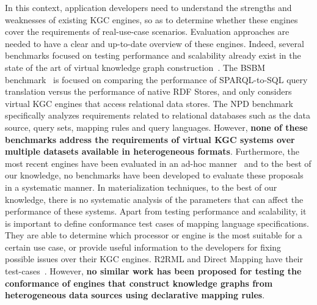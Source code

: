 In this context, application developers need to understand the strengths and weaknesses of existing KGC engines, so as to determine whether these engines cover the requirements of real-use-case scenarios. Evaluation approaches are needed to have a clear and up-to-date overview of these engines. Indeed, several benchmarks focused on testing performance and scalability already exist in the state of the art of virtual knowledge graph construction~\citep{bizer2009berlin,lanti2015npd}. The BSBM benchmark~\citep{bizer2009berlin} is focused on comparing the performance of SPARQL-to-SQL query translation versus the performance of native RDF Stores, and only considers virtual KGC engines that access relational data stores. The NPD benchmark~\citep{lanti2015npd} specifically analyzes requirements related to relational databases such as the data source, query sets, mapping rules and query languages. However, \textbf{none of these benchmarks address the requirements of virtual KGC systems over multiple datasets available in heterogeneous formats}. Furthermore, the most recent engines have been evaluated in an ad-hoc manner~\citep{endris2019ontario,mami2019querying} and to the best of our knowledge, no benchmarks have been developed to evaluate these proposals in a systematic manner. In materialization techniques, to the best of our knowledge, there is no systematic analysis of the parameters that can affect the performance of these systems. Apart from testing performance and scalability, it is important to define conformance test cases of mapping language specifications. They are able to determine which processor or engine is the most suitable for a certain use case, or provide useful information to the developers for fixing possible issues over their KGC engines. R2RML and Direct Mapping have their test-cases~\citep{R2RML_test_cases}. However, \textbf{no similar work has been proposed for testing the conformance of engines that construct knowledge graphs from heterogeneous data sources using declarative mapping rules}.

